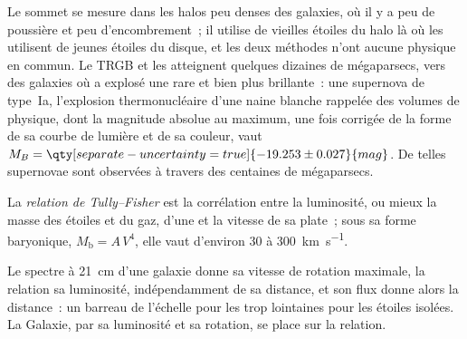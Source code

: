 Le sommet se mesure dans les halos peu denses des galaxies, où il y a peu de
poussière et peu d'encombrement~; il utilise de vieilles étoiles du halo là où
les  utilisent de jeunes étoiles du disque, et les deux méthodes n'ont aucune physique en commun. Le
TRGB et les  atteignent quelques dizaines de mégaparsecs, vers des galaxies où a explosé une
 rare et bien plus brillante~: une supernova de type~Ia, l'explosion
thermonucléaire d'une naine blanche rappelée des volumes de physique,
dont la magnitude absolue au maximum, une fois corrigée de la
forme de sa courbe de lumière et de sa couleur, vaut
$M_B = \qty[separate-uncertainty=true]{-19.253 \pm 0.027}{mag}$. De telles
supernovae sont observées à travers des centaines de mégaparsecs.

\begin{definition}\label{def:b3:milky-way-galaxies:tully-fisher}
La \emph{relation de Tully--Fisher} est la
corrélation entre la luminosité, ou mieux la masse des étoiles et du gaz,
d'une  et la vitesse de sa  plate~; sous sa
forme baryonique, $M_\mathrm{b} = A\,V^4$, elle vaut d'environ 30 à
\qty{300}{km.s^{-1}}.
\end{definition}

Le spectre à 21~cm d'une galaxie donne sa vitesse de rotation maximale, la
relation sa luminosité, indépendamment de sa distance, et son flux
donne alors la distance~: un barreau de l'échelle pour les  trop
lointaines pour les étoiles isolées. La Galaxie, par sa luminosité et sa rotation, se place sur la relation.

